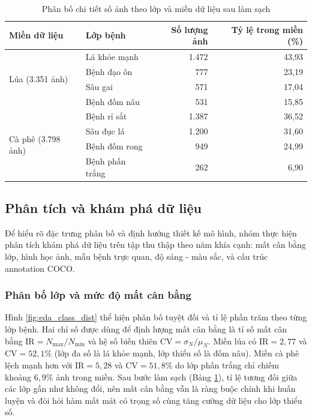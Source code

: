 \begin{table}[htbp]
    \centering
    \caption{Phân bố chi tiết số ảnh theo lớp và miền dữ liệu sau làm sạch}
    \label{tab:class_dist_clean}
    \begin{tabular}{llrr}
        \toprule
        \textbf{Miền dữ liệu} & \textbf{Lớp bệnh}        & \textbf{Số lượng ảnh} & \textbf{Tỷ lệ trong miền (\%)} \\
        \midrule
        \multirow{4}{*}{Lúa (3.351 ảnh)}
                     & Lá khỏe mạnh    & 1.472        & 43,93                 \\
                     & Bệnh đạo ôn     & 777          & 23,19                 \\
                     & Sâu gai         & 571          & 17,04                 \\
                     & Bệnh đốm nâu    & 531          & 15,85                 \\
        \midrule
        \multirow{4}{*}{Cà phê (3.798 ảnh)}
                     & Bệnh rỉ sắt     & 1.387        & 36,52                 \\
                     & Sâu đục lá      & 1.200        & 31,60                 \\
                     & Bệnh đốm rong   & 949          & 24,99                 \\
                     & Bệnh phấn trắng & 262          & 6,90                  \\
        \bottomrule
    \end{tabular}
\end{table}

\subsection{Phân tích và khám phá dữ liệu}
Để hiểu rõ đặc trưng phân bố và định hướng thiết kế mô hình, nhóm thực hiện phân tích khám phá dữ liệu trên tập thu thập theo năm khía cạnh: mất cân bằng lớp, hình học ảnh, mẫu bệnh trực quan, độ sáng - màu sắc, và cấu trúc annotation COCO.

\subsubsection{Phân bố lớp và mức độ mất cân bằng}
Hình \ref{fig:eda_class_dist} thể hiện phân bố tuyệt đối và tỉ lệ phần trăm theo từng lớp bệnh. Hai chỉ số được dùng để định lượng mất cân bằng là tỉ số mất cân bằng $\text{IR} = N_{\max}/N_{\min}$ và hệ số biến thiên $\text{CV} = \sigma_N/\mu_N$. Miền lúa có $\text{IR} = 2,77$ và $\text{CV} = 52,1\%$ (lớp đa số là lá khỏe mạnh, lớp thiểu số là đốm nâu). Miền cà phê lệch mạnh hơn với $\text{IR} = 5,28$ và $\text{CV} = 51,8\%$ do lớp phấn trắng chỉ chiếm khoảng $6,9\%$ ảnh trong miền. Sau bước làm sạch (Bảng \ref{tab:class_dist_clean}), tỉ lệ tương đối giữa các lớp gần như không đổi, nên mất cân bằng vẫn là ràng buộc chính khi huấn luyện và đòi hỏi hàm mất mát có trọng số cùng tăng cường dữ liệu cho lớp thiểu số.


